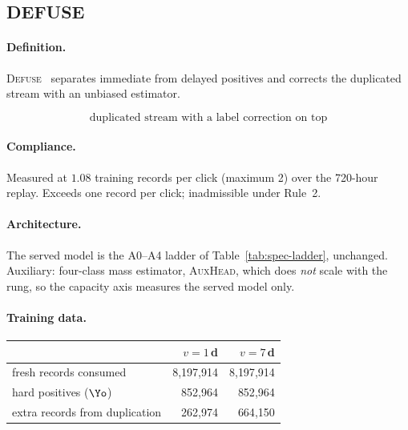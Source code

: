 \subsection{\textsc{DEFUSE}}\label{app:m-DEFUSE}

\paragraph{Definition.} \textsc{Defuse}~\cite{chen2022asymptotically} separates immediate from delayed
   positives and corrects the duplicated stream with an unbiased estimator.

\begin{equation}
\text{duplicated stream with a label correction on top}
\end{equation}

\begin{center}\end{center}

\paragraph{Compliance.} Measured at $1.08$ training records per click (maximum 2) over the 720-hour replay. Exceeds one record per click; inadmissible under Rule~2.

\paragraph{Architecture.} The served model is the A0--A4 ladder of Table~\ref{tab:spec-ladder}, unchanged. Auxiliary: four-class mass estimator, \textsc{AuxHead}, which does \emph{not} scale with the rung, so the capacity axis measures the served model only.

\paragraph{Training data.}
\begin{center}\small\begin{tabular}{lrr}
\toprule
 & $v=1$\,d & $v=7$\,d\\
\midrule
fresh records consumed & 8{,}197{,}914 & 8{,}197{,}914\\
hard positives ($\Yo$) & 852{,}964 & 852{,}964\\
extra records from duplication & 262{,}974 & 664{,}150\\
\bottomrule
\end{tabular}\end{center}

